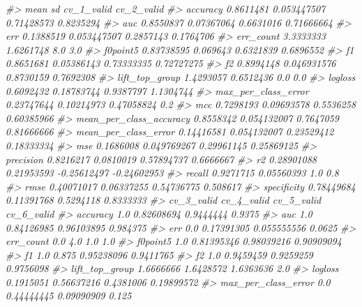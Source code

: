 \documentclass[]{book}
\newenvironment{Shaded}{\begin{snugshade}}{\end{snugshade}}
\newcommand{\CommentTok}[1]{\textcolor[rgb]{0.56,0.35,0.01}{\textit{#1}}}
\begin{document}
\begin{Shaded}
\begin{Highlighting}[]
{{{{{{\CommentTok{#>                               mean          sd  cv_1_valid  cv_2_valid}
\CommentTok{#> accuracy                 0.8611481 0.053447507  0.71428573   0.8235294}
\CommentTok{#> auc                      0.8550837  0.07367064   0.6631016  0.71666664}
\CommentTok{#> err                      0.1388519 0.053447507   0.2857143   0.1764706}
\CommentTok{#> err_count                3.3333333   1.6261748         8.0         3.0}
\CommentTok{#> f0point5                0.83738595    0.069643   0.6321839   0.6896552}
\CommentTok{#> f1                       0.8651681  0.05386143  0.73333335  0.72727275}
\CommentTok{#> f2                       0.8994148 0.046931576   0.8730159   0.7692308}
\CommentTok{#> lift_top_group           1.4293057   0.6512436         0.0         0.0}
\CommentTok{#> logloss                  0.6092432  0.18783744   0.9387797   1.1304744}
\CommentTok{#> max_per_class_error     0.23747644  0.10214973  0.47058824         0.2}
\CommentTok{#> mcc                      0.7298193  0.09693578   0.5536258  0.60385966}
\CommentTok{#> mean_per_class_accuracy  0.8558342 0.054132007   0.7647059  0.81666666}
\CommentTok{#> mean_per_class_error    0.14416581 0.054132007  0.23529412  0.18333334}
\CommentTok{#> mse                      0.1686008 0.049769267  0.29961145  0.25869125}
\CommentTok{#> precision                0.8216217   0.0810019  0.57894737   0.6666667}
\CommentTok{#> r2                      0.28901088  0.21953593 -0.25612497 -0.24602953}
\CommentTok{#> recall                   0.9271715  0.05560393         1.0         0.8}
\CommentTok{#> rmse                    0.40071017  0.06337255  0.54736775    0.508617}
\CommentTok{#> specificity             0.78449684  0.11391768   0.5294118   0.8333333}
\CommentTok{#>                         cv_3_valid cv_4_valid  cv_5_valid cv_6_valid}
\CommentTok{#> accuracy                       1.0 0.82608694   0.9444444     0.9375}
\CommentTok{#> auc                            1.0 0.84126985  0.96103895   0.984375}
\CommentTok{#> err                            0.0 0.17391305 0.055555556     0.0625}
\CommentTok{#> err_count                      0.0        4.0         1.0        1.0}
\CommentTok{#> f0point5                       1.0 0.81395346  0.98039216 0.90909094}
\CommentTok{#> f1                             1.0      0.875  0.95238096  0.9411765}
\CommentTok{#> f2                             1.0  0.9459459   0.9259259  0.9756098}
\CommentTok{#> lift_top_group           1.6666666  1.6428572   1.6363636        2.0}
\CommentTok{#> logloss                  0.1915051 0.56637216   0.4381006 0.19899572}
\CommentTok{#> max_per_class_error            0.0 0.44444445  0.09090909      0.125}
}}}}}}
\end{Highlighting}
\end{Shaded}
\end{document}
